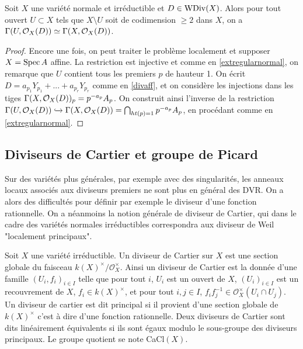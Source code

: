 \begin{prop}\label{somorphismcodim2}
Soit $X$ une variété normale et irréductible et $D\in\operatorname{WDiv}(X)$. Alors pour tout ouvert $U\subset X$ tels que $X\setminus U$ soit de codimension $\geq 2$ dans $X$, on a $\Gamma(U,\mathcal{O}_X(D))\simeq \Gamma(X,\mathcal{O}_X(D))$.
\end{prop}
\begin{proof}
Encore une fois, on peut traiter le problème localement et supposer $X=\operatorname{Spec} A$ affine. La restriction est injective et comme en \ref{extregularnormal}, on remarque que $U$ contient tous les premiers $p$ de hauteur 1. On écrit $D=a_{p_1}Y_{p_1}+...+a_{p_r}Y_{p_r}$ comme en \ref{divaff}, et on considère les injections dans les tiges $\Gamma(X,\mathcal{O}_X(D))_p=p^{-a_p}A_p$. On construit ainsi l'inverse de la restriction $\Gamma(U, \mathcal{O}_X(D))\xhookrightarrow{}\Gamma(X,\mathcal{O}_X(D))=\bigcap_{ht(p)=1}p^{-a_p}A_p$, en procédant comme en \ref{extregularnormal}.
\end{proof}

\subsection{Diviseurs de Cartier et groupe de Picard}

Sur des variétés plus générales, par exemple avec des singularités, les anneaux locaux associés aux diviseurs premiers ne sont plus en général des DVR. On a alors des difficultés pour définir par exemple le diviseur d'une fonction rationnelle. On a néanmoins la notion générale de diviseur de Cartier, qui dans le cadre des variétés normales irréductibles correspondra aux diviseur de Weil "localement principaux".

\begin{defn}
Soit $X$ une variété irréductible. Un diviseur de Cartier sur $X$ est une section globale du faisceau $k(X)^\times/\mathcal{O}_X^\times$. Ainsi un diviseur de Cartier est la donnée d'une famille $(U_i, f_i)_{i\in I}$ telle que pour tout $i$, $U_i$ est un ouvert de $X$, $(U_i)_{i\in I}$ est un recouvrement de $X$, $f_i\in k(X)^\times$, et pour tout $i,j \in I$, $f_if_j^{-1}\in \mathcal{O}_X^\times(U_i\cap U_j)$.\\
Un diviseur de cartier est dit principal si il provient d'une section globale de $k(X)^\times$ c'est à dire d'une fonction rationnelle. Deux diviseurs de Cartier sont dits linéairement équivalents si ils sont égaux modulo le sous-groupe des diviseurs principaux. Le groupe quotient se note CaCl$(X)$.
\end{defn}





